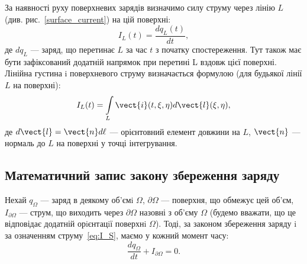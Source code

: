 \begin{itemize}
\begin{SCfigure}[2][h!]
    \centering
\caption{}
\label{surface_current}
\end{SCfigure}

 За наявності руху поверхневих зарядів визначимо силу струму через лінію
$L$ (див. рис.~\ref{surface_current}) на цій поверхні:
\begin{equation}
    I_L(t) = \frac{dq_L(t)}{dt},
\end{equation}
де $dq_L$ --- заряд, що перетинає $L$ за час $ t$ з початку спостереження. Тут також
має бути зафіксований додатній напрямок при перетині L вздовж цієї поверхні.
Лінійна густина i поверхневого струму визначається формулою (для будьякої лінії $L$ на поверхні):
\begin{equation}
    I_L(t) = \int\limits_L \vect{i}(t, \xi, \eta) d\vect{l}(\xi, \eta),
\end{equation}
де $d\vect{l} = \vect{n} d \ell$ --- орієнтовний елемент довжини на $L$, $\vect{n}$ --- нормаль до $L$ на поверхні у
точці інтегрування.

\end{itemize}

\subsection*{Математичний запис закону збереження заряду}


Нехай $q_{\Omega}$ --- заряд в деякому об'ємi $\Omega$, $\partial\Omega$ --- поверхня, що обмежує цей
об'єм, $I_{\partial\Omega}$ --- струм, що виходить через $\partial\Omega$ назовні з об'єму $\Omega$ (будемо вважати,
що це відповідає додатній орiєнтацiї поверхнi $\Omega$). Тоді, за законом збереження заряду i за означенням струму~\eqref{eq:I_S}, маємо у кожний момент
часу:
\begin{equation}\label{eq:charge_conservation_low_int}
    \frac{dq_{\Omega}}{dt} + I_{\partial\Omega}   = 0.
\end{equation}

